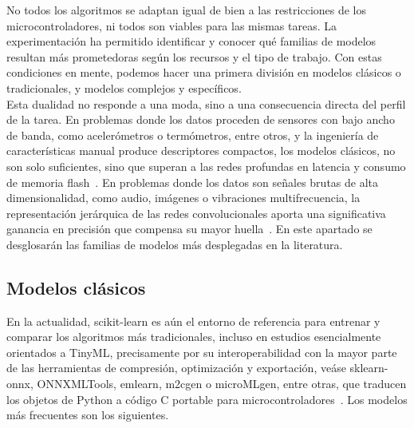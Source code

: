 \documentclass[a4paper,12pt,twoside,final]{book}
\begin{document}
No todos los algoritmos se adaptan igual de bien a las restricciones de los microcontroladores, ni todos son viables
para las mismas tareas. La experimentación ha permitido identificar y conocer qué familias de modelos resultan más
prometedoras según los recursos y el tipo de trabajo. Con estas condiciones en mente, podemos hacer una primera
división en modelos clásicos o tradicionales, y modelos complejos y específicos.\\

Esta dualidad no responde a una moda, sino a una consecuencia directa del perfil de la tarea. En problemas donde los
datos proceden de sensores con bajo ancho de banda, como acelerómetros o termómetros, entre otros, y la ingeniería
de características manual produce descriptores compactos, los modelos clásicos, no son solo suficientes, sino que
superan a las redes profundas en latencia y consumo de memoria flash~\cite{delnevo2022iot}. En problemas donde los
datos son señales brutas de alta dimensionalidad, como audio, imágenes o vibraciones multifrecuencia, la
representación jerárquica de las redes convolucionales aporta una significativa ganancia en precisión que compensa
su mayor huella~\cite{zhang2022helloedge,charan2022sae}. En este apartado se desglosarán las familias de modelos más
desplegadas en la literatura.

\subsection{Modelos clásicos}
En la actualidad, scikit-learn es aún el entorno de referencia para entrenar y comparar los algoritmos más
tradicionales, incluso en estudios esencialmente orientados a TinyML, precisamente por su interoperabilidad con
la mayor parte de las herramientas de compresión, optimización y exportación, veáse sklearn-onnx, ONNXMLTools,
emlearn, m2cgen o microMLgen, entre otras, que traducen los objetos de Python a código C portable para
microcontroladores~\cite{delnevo2022iot,saha2022ieeejsen,dasilva2022ieeejsen,sipola2022fruct}. Los modelos más
frecuentes son los siguientes.
\end{document}
